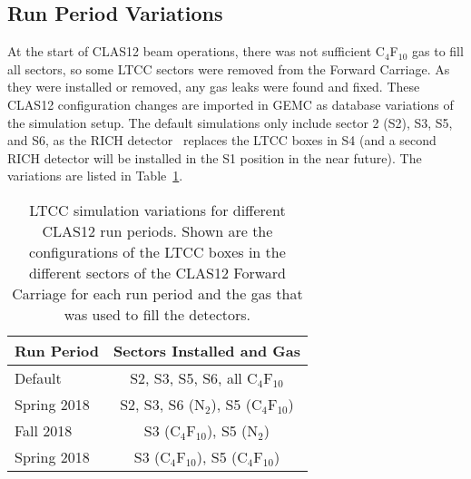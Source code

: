 \subsection{Run Period Variations}

At the start of CLAS12 beam operations, there was not sufficient C$_4$F$_{10}$ gas to fill all sectors, so some LTCC
sectors were removed from the Forward Carriage. As they were installed or removed, any gas leaks were found and
fixed. These CLAS12 configuration changes are imported in GEMC as database variations of the simulation setup. The
default simulations only include sector 2 (S2), S3, S5, and S6, as the RICH detector~\cite{rich-nim} replaces the LTCC
boxes in S4 (and a second RICH detector will be installed in the S1 position in the near future). The variations are listed
in Table~\ref{tab:simVariations}.

\begin{table}
	\begin{center}
		\begin{tabular}{| l | c |}
			\hline \hline
			Run Period       & Sectors Installed and Gas \\
			\hline
			Default          & S2, S3, S5, S6, all C$_4$F$_{10}$    \\
			Spring 2018  & S2, S3, S6 (N$_2$), S5 (C$_4$F$_{10}$)  \\
			Fall 2018    & S3 (C$_4$F$_{10}$), S5 (N$_2$)          \\
			Spring 2018  & S3 (C$_4$F$_{10}$), S5 (C$_4$F$_{10}$) \\
			\hline \hline
		\end{tabular}
	\end{center}
	\caption{LTCC simulation variations for different CLAS12 run periods. Shown are the configurations of the
          LTCC boxes in the different sectors of the CLAS12 Forward Carriage for each run period and the gas that
          was used to fill the detectors.}
	\label{tab:simVariations}
\end{table}
